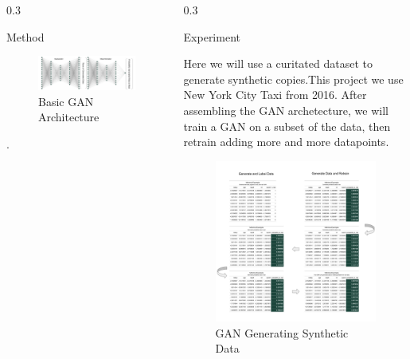 \documentclass{msuposter}
\newcommand{\colwidth}{0.3\linewidth}
\begin{document}
\begin{frame}{}
\begin{columns}[t]
\begin{column}{\colwidth}
\begin{block}{Method}
\begin{figure}
  \includegraphics[width=\linewidth]{gan_diag.png}
    	\caption{\label{fig:my-label} Basic GAN Architecture}
\end{figure}

\newpage 



\end{block}. 


\end{column}


\begin{column}{\colwidth}

\begin{block}{Experiment}

Here we will use a curitated dataset to generate synthetic copies.This project we use New York City Taxi from 2016\cite{nyc2016}. After assembling the GAN archetecture, we will train a GAN on a subset of the data, then retrain adding more and more datapoints. 

\begin{figure}
  \includegraphics[width=\linewidth]{gan_conv.png}
      	\caption{\label{fig:my-label} GAN Generating Synthetic Data}
\end{figure}




\end{block}
\end{column}
\end{columns}
\end{frame}
\end{document}
